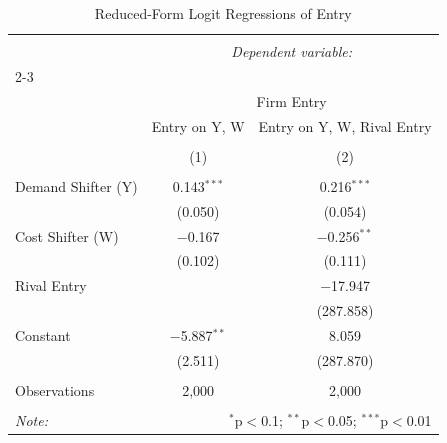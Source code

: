 
\begin{table}[!htbp] \centering 
  \caption{Reduced-Form Logit Regressions of Entry} 
  \label{} 
\begin{tabular}{@{\extracolsep{5pt}}lcc} 
\\[-1.8ex]\hline 
\hline \\[-1.8ex] 
 & \multicolumn{2}{c}{\textit{Dependent variable:}} \\ 
\cline{2-3} 
\\[-1.8ex] & \multicolumn{2}{c}{Firm Entry} \\ 
 & Entry on Y, W & Entry on Y, W, Rival Entry \\ 
\\[-1.8ex] & (1) & (2)\\ 
\hline \\[-1.8ex] 
 Demand Shifter (Y) & 0.143$^{***}$ & 0.216$^{***}$ \\ 
  & (0.050) & (0.054) \\ 
  Cost Shifter (W) & $-$0.167 & $-$0.256$^{**}$ \\ 
  & (0.102) & (0.111) \\ 
  Rival Entry &  & $-$17.947 \\ 
  &  & (287.858) \\ 
  Constant & $-$5.887$^{**}$ & 8.059 \\ 
  & (2.511) & (287.870) \\ 
 \hline \\[-1.8ex] 
Observations & 2,000 & 2,000 \\ 
\hline 
\hline \\[-1.8ex] 
\textit{Note:}  & \multicolumn{2}{r}{$^{*}$p$<$0.1; $^{**}$p$<$0.05; $^{***}$p$<$0.01} \\ 
\end{tabular} 
\end{table} 
